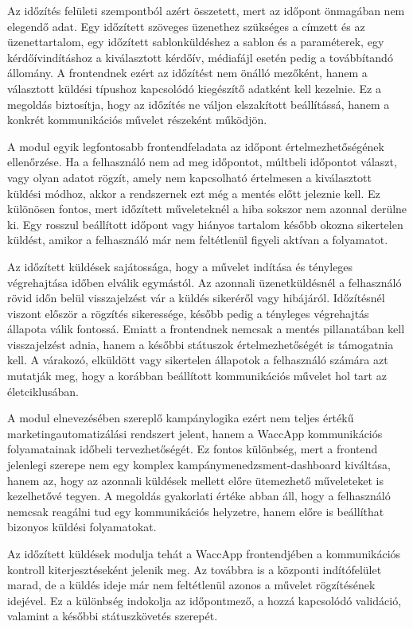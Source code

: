Az időzítés felületi szempontból azért összetett, mert az időpont önmagában nem elegendő adat. Egy időzített szöveges üzenethez szükséges a címzett és az üzenettartalom, egy időzített sablonküldéshez a sablon és a paraméterek, egy kérdőívindításhoz a kiválasztott kérdőív, médiafájl esetén pedig a továbbítandó állomány. A frontendnek ezért az időzítést nem önálló mezőként, hanem a választott küldési típushoz kapcsolódó kiegészítő adatként kell kezelnie. Ez a megoldás biztosítja, hogy az időzítés ne váljon elszakított beállítássá, hanem a konkrét kommunikációs művelet részeként működjön. 

A modul egyik legfontosabb frontendfeladata az időpont értelmezhetőségének ellenőrzése. Ha a felhasználó nem ad meg időpontot, múltbeli időpontot választ, vagy olyan adatot rögzít, amely nem kapcsolható értelmesen a kiválasztott küldési módhoz, akkor a rendszernek ezt még a mentés előtt jeleznie kell. Ez különösen fontos, mert időzített műveleteknél a hiba sokszor nem azonnal derülne ki. Egy rosszul beállított időpont vagy hiányos tartalom később okozna sikertelen küldést, amikor a felhasználó már nem feltétlenül figyeli aktívan a folyamatot. 

Az időzített küldések sajátossága, hogy a művelet indítása és tényleges végrehajtása időben elválik egymástól. Az azonnali üzenetküldésnél a felhasználó rövid időn belül visszajelzést vár a küldés sikeréről vagy hibájáról. Időzítésnél viszont először a rögzítés sikeressége, később pedig a tényleges végrehajtás állapota válik fontossá. Emiatt a frontendnek nemcsak a mentés pillanatában kell visszajelzést adnia, hanem a későbbi státuszok értelmezhetőségét is támogatnia kell. A várakozó, elküldött vagy sikertelen állapotok a felhasználó számára azt mutatják meg, hogy a korábban beállított kommunikációs művelet hol tart az életciklusában. 

A modul elnevezésében szereplő kampánylogika ezért nem teljes értékű marketingautomatizálási rendszert jelent, hanem a WaccApp kommunikációs folyamatainak időbeli tervezhetőségét. Ez fontos különbség, mert a frontend jelenlegi szerepe nem egy komplex kampánymenedzsment-dashboard kiváltása, hanem az, hogy az azonnali küldések mellett előre ütemezhető műveleteket is kezelhetővé tegyen. A megoldás gyakorlati értéke abban áll, hogy a felhasználó nemcsak reagálni tud egy kommunikációs helyzetre, hanem előre is beállíthat bizonyos küldési folyamatokat. 

Az időzített küldések modulja tehát a WaccApp frontendjében a kommunikációs kontroll kiterjesztéseként jelenik meg. Az  továbbra is a központi indítófelület marad, de a küldés ideje már nem feltétlenül azonos a művelet rögzítésének idejével. Ez a különbség indokolja az időpontmező, a hozzá kapcsolódó validáció, valamint a későbbi státuszkövetés szerepét. 

